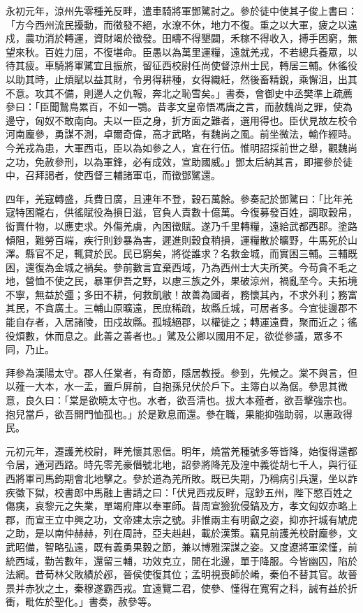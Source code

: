 \begin{pinyinscope}
永初元年，涼州先零種羌反畔，遣車騎將軍鄧騭討之。參於徒中使其子俊上書曰：「方今西州流民擾動，而徵發不絕，水潦不休，地力不復。重之以大軍，疲之以遠戍，農功消於轉運，資財竭於徵發。田疇不得墾闢，禾稼不得收入，搏手困窮，無望來秋。百姓力屈，不復堪命。臣愚以為萬里運糧，遠就羌戎，不若總兵養眾，以待其疲。車騎將軍騭宜且振旅，留征西校尉任尚使督涼州士民，轉居三輔。休徭役以助其時，止煩賦以益其財，令男得耕種，女得織紝，然後畜精銳，乘懈沮，出其不意。攻其不備，則邊人之仇報，奔北之恥雪矣。」書奏，會御史中丞樊準上疏薦參曰：「臣聞鷙鳥累百，不如一鶚。昔孝文皇帝悟馮唐之言，而赦魏尚之罪，使為邊守，匈奴不敢南向。夫以一臣之身，折方面之難者，選用得也。臣伏見故左校令河南龐參，勇謀不測，卓爾奇偉，高才武略，有魏尚之風。前坐微法，輸作經時。今羌戎為患，大軍西屯，臣以為如參之人，宜在行伍。惟明詔採前世之舉，觀魏尚之功，免赦參刑，以為軍鋒，必有成效，宣助國威。」鄧太后納其言，即擢參於徒中，召拜謁者，使西督三輔諸軍屯，而徵鄧騭還。

四年，羌寇轉盛，兵費日廣，且連年不登，穀石萬餘。參奏記於鄧騭曰：「比年羌寇特困隴右，供徭賦役為損日滋，官負人責數十億萬。今復募發百姓，調取穀帛，衒賣什物，以應吏求。外傷羌虜，內困徵賦。遂乃千里轉糧，遠給武都西郡。塗路傾阻，難勞百端，疾行則鈔暴為害，遲進則穀食稍損，運糧散於曠野，牛馬死於山澤。縣官不足，輒貸於民。民已窮矣，將從誰求？名救金城，而實困三輔。三輔既困，還復為金城之禍矣。參前數言宜棄西域，乃為西州士大夫所笑。今苟貪不毛之地，營恤不使之民，暴軍伊吾之野，以慮三族之外，果破涼州，禍亂至今。夫拓境不寧，無益於彊；多田不耕，何救飢敝！故善為國者，務懷其內，不求外利；務富其民，不貪廣土。三輔山原曠遠，民庶稀疏，故縣丘城，可居者多。今宜徙邊郡不能自存者，入居諸陵，田戍故縣。孤城絕郡，以權徙之；轉運遠費，聚而近之；徭役煩數，休而息之。此善之善者也。」騭及公卿以國用不足，欲從參議，眾多不同，乃止。

拜參為漢陽太守。郡人任棠者，有奇節，隱居教授。參到，先候之。棠不與言，但以薤一大本，水一盂，置戶屏前，自抱孫兒伏於戶下。主簿白以為倨。參思其微意，良久曰：「棠是欲曉太守也。水者，欲吾清也。拔大本薤者，欲吾擊強宗也。抱兒當戶，欲吾開門恤孤也。」於是歎息而還。參在職，果能抑強助弱，以惠政得民。

元初元年，遷護羌校尉，畔羌懷其恩信。明年，燒當羌種號多等皆降，始復得還都令居，通河西路。時先零羌豪僭號北地，詔參將降羌及湟中義從胡七千人，與行征西將軍司馬鈞期會北地擊之。參於道為羌所敗。既已失期，乃稱病引兵還，坐以詐疾徵下獄，校書郎中馬融上書請之曰：「伏見西戎反畔，寇鈔五州，陛下愍百姓之傷痍，哀黎元之失業，單竭府庫以奉軍師。昔周宣獫狁侵鎬及方，孝文匈奴亦略上郡，而宣王立中興之功，文帝建太宗之號。非惟兩主有明叡之姿，抑亦扞城有虓虎之助，是以南仲赫赫，列在周詩，亞夫赳赳，載於漢策。竊見前護羌校尉龐參，文武昭備，智略弘遠，既有義勇果毅之節，兼以博雅深謀之姿。又度遼將軍梁慬，前統西域，勤苦數年，還留三輔，功效克立，閒在北邊，單于降服。今皆幽囚，陷於法網。昔荀林父敗績於邲，晉侯使復其位；孟明視喪師於崤，秦伯不替其官。故晉景并赤狄之土，秦穆遂霸西戎。宜遠覽二君，使參、慬得在寬宥之科，誠有益於折衝，毗佐於聖化。」書奏，赦參等。


\end{pinyinscope}
